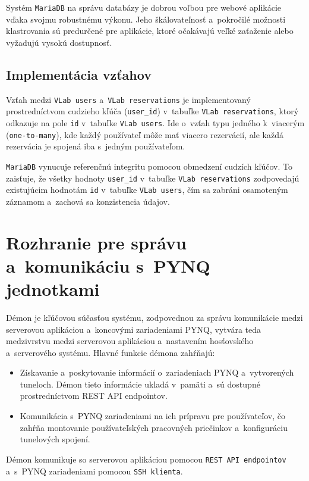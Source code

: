 Systém \verb|MariaDB| na správu databázy je dobrou voľbou pre webové aplikácie vďaka svojmu robustnému výkonu. Jeho škálovateľnosť a~pokročilé možnosti klastrovania sú predurčené pre aplikácie, ktoré očakávajú veľké zaťaženie alebo vyžadujú vysokú dostupnosť.

\subsection{Implementácia vzťahov}

Vzťah medzi \verb|VLab users| a~\verb|VLab reservations| je implementovaný prostredníctvom cudzieho kľúča (\verb|user_id|) v~tabuľke  \verb|VLab reservations|, ktorý odkazuje na pole \verb|id| v~tabuľke \verb|VLab users|. Ide o~vzťah typu jedného k~viacerým (\verb|one-to-many|), kde každý používateľ môže mať viacero rezervácií, ale každá rezervácia je spojená iba s~jedným používateľom.

\verb|MariaDB| vynucuje referenčnú integritu pomocou obmedzení cudzích kľúčov. To zaisťuje, že všetky hodnoty \verb|user_id| v~tabuľke \verb|VLab reservations| zodpovedajú existujúcim hodnotám \verb|id| v~tabuľke \verb|VLab users|, čím sa zabráni osamoteným záznamom a~zachová sa konzistencia údajov.

\section{Rozhranie pre správu a~komunikáciu s~PYNQ jednotkami}

Démon je kľúčovou súčasťou systému, zodpovednou za správu komunikácie medzi serverovou aplikáciou a~koncovými zariadeniami PYNQ, vytvára teda medzivrstvu medzi serverovou aplikáciou a~nastavením hosťovského a~serverového systému. Hlavné funkcie démona zahŕňajú:

\begin{itemize}
    \item Získavanie a~poskytovanie informácií o~zariadeniach PYNQ a~vytvorených tuneloch. Démon tieto informácie ukladá v~pamäti a~sú dostupné prostredníctvom REST API endpointov.
    \item Komunikácia s~PYNQ zariadeniami na ich prípravu pre používateľov, čo zahŕňa montovanie používateľských pracovných priečinkov a~konfiguráciu tunelových spojení.
\end{itemize}

Démon komunikuje so serverovou aplikáciou pomocou \verb|REST API endpointov| a~s~PYNQ zariadeniami pomocou \verb|SSH klienta|.


